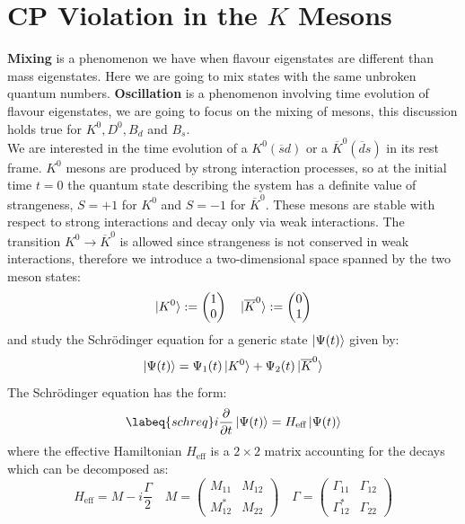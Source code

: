 \documentclass[../main.tex]{subfiles}
\begin{document}
\section{CP Violation in the $K$ Mesons}
\textbf{Mixing} is a phenomenon we have when flavour eigenstates are different than mass eigenstates. Here we are going to mix states with the same unbroken quantum numbers. \textbf{Oscillation} is a phenomenon involving time evolution of flavour eigenstates, we are going to focus on the mixing of mesons, this discussion holds true for $K^0, D^0, B_d$ and $B_s$.\\
We are interested in the time evolution of a $K^0 (\overline{s}d)$ or a $\overline{K}^0 (\overline{d}s)$ in its rest frame. $K^0$ mesons are produced by strong interaction processes, so at the initial time $t=0$ the quantum state describing the system has a definite value of strangeness, $S=+1$ for $K^0$ and $S=-1$ for $\overline{K}^0$. These mesons are stable with respect to strong interactions and decay only via weak interactions. The transition $K^0\to\overline{K}^0$ is allowed since strangeness is not conserved in weak interactions, therefore we introduce a two-dimensional space spanned by the two meson states:
\[
\ket{K^0}:=\begin{pmatrix}1\\0\end{pmatrix} \quad \ket{\overline{K}^0}:=\begin{pmatrix}0\\1\end{pmatrix}
\]
and study the Schr\"odinger equation for a generic state $\ket{\Psi(t)}$ given by:
\[
\ket{\Psi(t)}=\Psi_1(t)\ket{K^0}+\Psi_2(t)\ket{\overline{K}^0}
\]
The Schr\"odinger equation has the form:
\begin{equation}
\labeq{schreq} 
i\frac{\partial}{\partial t}\ket{\Psi(t)}=H_{\text{eff}}\ket{\Psi(t)}
\end{equation}
where the effective Hamiltonian $H_{\text{eff}}$ is a $2\times2$ matrix accounting for the decays which can be decomposed as:
\[
H_{\text{eff}}=M-i\frac{\Gamma}{2} \quad M=\left(\begin{array}{cc}
    M_{11} & M_{12} \\
    M^*_{12} & M_{22}
\end{array}\right) \quad \Gamma=\left(\begin{array}{cc}
    \Gamma_{11} & \Gamma_{12} \\
    \Gamma^*_{12} & \Gamma_{22}
\end{array}\right)
\]
\end{document}
